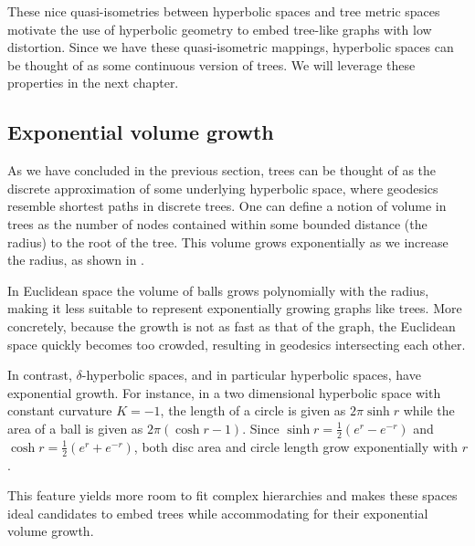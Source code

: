 These nice quasi-isometries between hyperbolic spaces and tree metric spaces motivate the use of hyperbolic geometry to embed tree-like graphs with low distortion. Since we have these quasi-isometric mappings, hyperbolic spaces can be thought of as some continuous version of trees. We will leverage these properties in the next chapter. 

\subsection{Exponential volume growth}\label{sec:expGrowth}
As we have concluded in the previous section, trees can be thought of as the discrete approximation of some underlying hyperbolic space, where geodesics resemble shortest paths in discrete trees. One can define a notion of volume in trees as the number of nodes contained within some bounded distance (the radius) to the root of the tree. This volume grows exponentially as we increase the radius, as shown in .



In Euclidean space the volume of balls grows polynomially with the radius, making it less suitable to represent exponentially growing graphs like trees. More concretely, because the growth is not as fast as that of the graph, the Euclidean space quickly becomes too crowded, resulting in geodesics intersecting each other.

In contrast, $\delta$-hyperbolic spaces, and in particular hyperbolic spaces, have exponential growth. For instance, in a two dimensional hyperbolic space with constant curvature $K = -1$, the length of a circle is given as $2\pi \sinh r$ while the area of a ball is given as $2\pi(\cosh r - 1)$. Since $\sinh r = \frac{1}{2} (e^r - e^{-r})$ and $\cosh r = \frac{1}{2} (e^r + e^{-r})$, both disc area and circle length grow exponentially with $r$. 

This feature yields more room to fit complex hierarchies and makes these spaces ideal candidates to embed trees while accommodating for their exponential volume growth. 